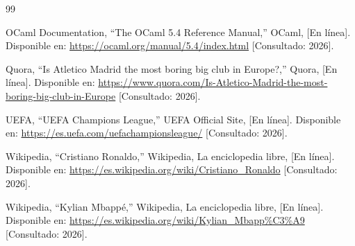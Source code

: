 \documentclass[12pt,a4paper]{article}
\begin{document}
\begin{thebibliography}{99}

OCaml Documentation,
``The OCaml 5.4 Reference Manual,''
OCaml, [En línea].
Disponible en: \url{https://ocaml.org/manual/5.4/index.html}
[Consultado: 2026].

Quora,
``Is Atletico Madrid the most boring big club in Europe?,''
Quora, [En línea].
Disponible en: \url{https://www.quora.com/Is-Atletico-Madrid-the-most-boring-big-club-in-Europe}
[Consultado: 2026].

UEFA,
``UEFA Champions League,''
UEFA Official Site, [En línea].
Disponible en: \url{https://es.uefa.com/uefachampionsleague/}
[Consultado: 2026].

Wikipedia,
``Cristiano Ronaldo,''
Wikipedia, La enciclopedia libre, [En línea].
Disponible en: \url{https://es.wikipedia.org/wiki/Cristiano_Ronaldo}
[Consultado: 2026].

Wikipedia,
``Kylian Mbappé,''
Wikipedia, La enciclopedia libre, [En línea].
Disponible en: \url{https://es.wikipedia.org/wiki/Kylian_Mbapp\%C3\%A9}
[Consultado: 2026].

\end{thebibliography}
\end{document}
